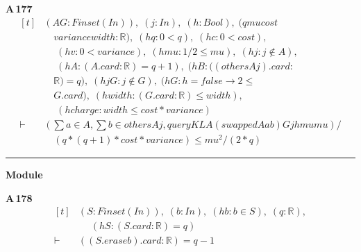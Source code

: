 \noindent\textbf{A\,177}\quad{}
{\footnotesize\[ \begin{aligned}[t]
&(\mathit{A} \mathit{G} : \mathit{Finset} (\mathit{I} \mathit{n})),\; (\mathit{j} : \mathit{I} \mathit{n}),\; (\mathit{h} : \mathit{Bool}),\; (\mathit{q} \mathit{mu} \mathit{cost}\\
&\quad \mathit{variance} \mathit{width} : \mathbb{R} ),\; (\mathit{hq} : 0<\mathit{q}),\; (\mathit{hc} : 0<\mathit{cost}),\\
&\quad \; (\mathit{hv} : 0<\mathit{variance}),\; (\mathit{hmu} : 1/2 \leq \mathit{mu}),\; (\mathit{hj} : \mathit{j} \notin \mathit{A}),\\
&\quad \; (\mathit{hA} : (\mathit{A}.\mathit{card}:\mathbb{R} )=\mathit{q}+1),\; (\mathit{hB} : ((\mathit{others} \mathit{A} \mathit{j}).\mathit{card}:\\
&\quad \mathbb{R} )=\mathit{q}),\; (\mathit{hjG} : \mathit{j} \notin \mathit{G}),\; (\mathit{hG} : \mathit{h}=\mathit{false} \to 2 \leq\\
&\quad \mathit{G}.\mathit{card}),\; (\mathit{hwidth} : (\mathit{G}.\mathit{card}:\mathbb{R} ) \leq \mathit{width}),\\
&\quad \; (\mathit{hcharge} : \mathit{width} \leq \mathit{cost}*\mathit{variance})\\
\vdash\;&(\textstyle\sum \mathit{a} \in \mathit{A},\textstyle\sum \mathit{b} \in \mathit{others} \mathit{A} \mathit{j},\mathit{queryKL} \mathit{A} (\mathit{swapped} \mathit{A} \mathit{a} \mathit{b}) \mathit{G} \mathit{j} \mathit{h} \mathit{mu} \mathit{mu})/\\
&\quad (\mathit{q}*(\mathit{q}+1)*\mathit{cost}*\mathit{variance}) \leq \mathit{mu}^{2}/(2*\mathit{q})
\end{aligned} \]}

\vspace{4pt}\noindent\rule{\columnwidth}{0.4pt}\par\vspace{2pt}
\noindent\textbf{Module }\par\vspace{3pt}

\noindent\textbf{A\,178}\quad{}
{\footnotesize\[ \begin{aligned}[t]
&(\mathit{S} : \mathit{Finset} (\mathit{I} \mathit{n})),\; (\mathit{b} : \mathit{I} \mathit{n}),\; (\mathit{hb} : \mathit{b} \in \mathit{S}),\; (\mathit{q} : \mathbb{R} ),\\
&\quad \; (\mathit{hS} : (\mathit{S}.\mathit{card} : \mathbb{R} ) = \mathit{q})\\
\vdash\;&((\mathit{S}.\mathit{erase} \mathit{b}).\mathit{card} : \mathbb{R} ) = \mathit{q}-1
\end{aligned} \]}

